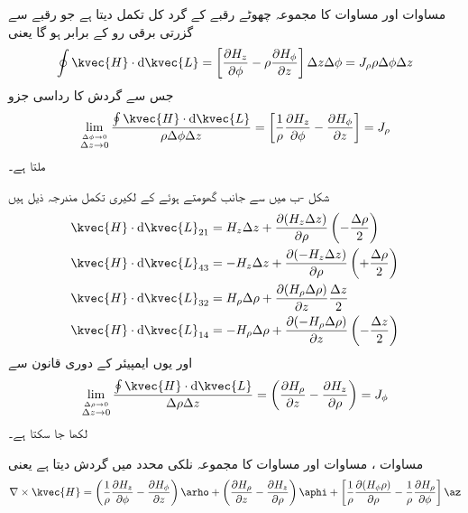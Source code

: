 مساوات  اور مساوات  کا مجموعہ چھوٹے رقبے کے گرد کل تکمل دیتا ہے جو رقبے سے گزرتی برقی رو  کے برابر ہو گا یعنی
\begin{align*}
\oint \kvec{H} \cdot \dif \kvec{L}=\left[ \frac{\partial H_z}{\partial \phi}-\rho\frac{\partial H_{\phi}}{\partial z} \right]\Delta z\Delta \phi=J_{\rho} \rho \Delta \phi \Delta z
\end{align*}
جس سے گردش کا رداسی جزو
\begin{align}\label{مساوات_مقناطیسی_رداسی_نلکی_گردش}
\lim_{\overset{\Delta \phi \to 0}{\Delta z \to 0}}\frac{\oint \kvec{H} \cdot \dif \kvec{L}}{\rho \Delta \phi \Delta z}=\left[\frac{1}{\rho}\frac{\partial H_z}{\partial \phi} -\frac{\partial H_{\phi}}{\partial z}\right]=J_{\rho}
\end{align}
ملتا ہے۔

شکل -ب میں  سے  جانب گھومتے ہوئے   کے لکیری تکمل مندرجہ ذیل ہیں
\begin{align*}
\kvec{H} \cdot \dif \kvec{L}_{21}&=H_z \Delta z+\frac{\partial (H_z \Delta z)}{\partial \rho}\left(-\frac{\Delta \rho}{2}\right)\\
\kvec{H} \cdot \dif \kvec{L}_{43}&=-H_z \Delta z+\frac{\partial (-H_z \Delta z)}{\partial \rho}\left(+\frac{\Delta \rho}{2}\right)\\
\kvec{H} \cdot \dif \kvec{L}_{32}&=H_{\rho}\Delta \rho+\frac{\partial (H_{\rho}\Delta \rho)}{\partial  z}\frac{\Delta z}{2}\\
\kvec{H} \cdot \dif \kvec{L}_{14}&=-H_{\rho}\Delta \rho+\frac{\partial (-H_{\rho}\Delta \rho)}{\partial z}\left(-\frac{\Delta z}{2}\right)
\end{align*}
اور یوں ایمپیئر کے دوری قانون سے
\begin{align}\label{مساوات_مقناطیسی_زاویائی_نلکی_گردش}
\lim_{\overset{\Delta \rho \to 0}{\Delta z \to 0}}\frac{\oint \kvec{H} \cdot \dif \kvec{L}}{\Delta \rho \Delta z}=\left(\frac{\partial H_\rho}{\partial z}-\frac{\partial H_z}{\partial \rho} \right)=J_{\phi}
\end{align}
لکھا جا سکتا ہے۔

مساوات ، مساوات  اور مساوات  کا مجموعہ نلکی محدد میں گردش دیتا ہے یعنی
\begin{align}\label{مساوات_مقناطیسی_نلکی_محدد_میں_گردش}
\nabla \times \kvec{H}=\left(\frac{1}{\rho}\frac{\partial H_z}{\partial \phi} -\frac{\partial H_{\phi}}{\partial z}\right)\arho+\left(\frac{\partial H_\rho}{\partial z}-\frac{\partial H_z}{\partial \rho} \right)\aphi+\left[\frac{1}{\rho}\frac{\partial (H_{\phi}\rho )}{\partial \rho}-\frac{1}{\rho}\frac{\partial H_{\rho}}{\partial \phi}\right]\az
\end{align}

